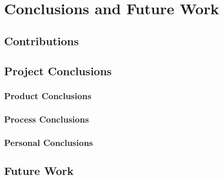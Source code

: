 \chapter{Conclusions and Future Work}\label{chap:conclusions}



\section{Contributions}  %



\section{Project Conclusions}


\subsection{Product Conclusions}


\subsection{Process Conclusions}



\subsection{Personal Conclusions}



\section{Future Work}
